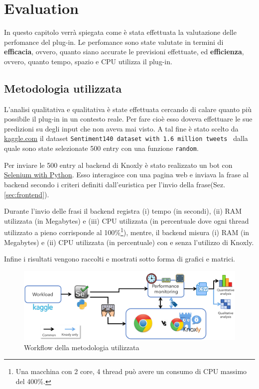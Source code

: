 \chapter{Evaluation}
In questo capitolo verrà spiegata come è stata effettuata la valutazione delle perfomance del plug-in. Le perfomance sono state valutate in termini di \textbf{efficacia}, ovvero, quanto siano accurate le previsioni effettuate, ed \textbf{efficienza}, ovvero, quanto tempo, spazio e CPU utilizza il plug-in.   

\section{Metodologia utilizzata}
\label{sec:metodologiaevaluation}
L'analisi qualitativa e qualitativa è state effettuata cercando di calare quanto più possibile il plug-in in un contesto reale. Per fare cioè esso doveva effettuare le sue predizioni su degli input che non aveva mai visto. A tal fine è stato scelto da \href{https://www.kaggle.com/}{kaggle.com} il dataset {\tt Sentiment140 dataset with 1.6 million tweets }\cite{sentiment140} dalla quale sono state selezionate 500 entry con una funzione {\tt random}.

Per inviare le 500 entry al backend di Knoxly è stato realizzato un bot con \href{https://selenium-python.readthedocs.io/}{Selenium with Python}. Esso interagisce con una pagina web e inviava la frase al backend secondo i criteri definiti  dall'euristica per l'invio della frase(Sez. \ref{sec:frontend}).

Durante l'invio delle frasi il backend registra (i) tempo (in secondi), (ii) RAM utilizzata (in Megabytes) e (iii) CPU utilizzata (in percentuale dove ogni thread utilizzato a pieno corrisponde al 100\%\footnote{Una macchina con 2 core, 4 thread può avere un consumo di CPU massimo del 400\%.}), mentre, il backend misura (i) RAM (in Megabytes) e (ii) CPU utilizzata (in percentuale) con e senza l'utilizzo di Knoxly.

Infine i risultati vengono raccolti e mostrati sotto forma di grafici e matrici.

\begin{figure}[h!t]
    \centering
    \includegraphics[width=15cm]{Figure/grafici/evaluation_cropped.pdf}
    \caption{Workflow della metodologia utilizzata}
    \label{fig:methodeval}
\end{figure}
\FloatBarrier

